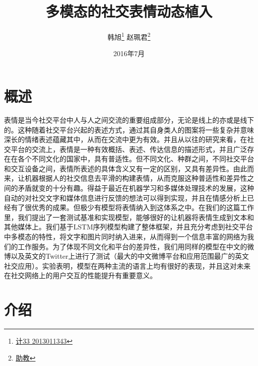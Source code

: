 \documentclass[10pt, titlepage]{article}
\begin{document}
\title{
\Huge\textbf{多模态的社交表情动态植入}
}


\author{
韩旭\thanks{\href{mailto:计33 2013011343}{计33 2013011343}}\quad
赵珮君\thanks{\href{mailto:助教}{助教}}}

\date{2016年7月}
\maketitle
\renewcommand{\contentsname}{\textbf{Contents}}
\renewcommand{\figurename}{\textbf{figure}}
\renewcommand{\tablename}{\textbf{table}}
\tableofcontents
\newpage



\section{概述}
表情是当今社交平台中人与人之间交流的重要组成部分，无论是线上的亦或是线下的。这种随着社交平台兴起的表述方式，通过其自身类人的图案将一些复杂并意味深长的情绪表述蕴藏其中，从而在交流中更为有效。并且从以往的研究来看，在社交平台的交流上，表情是一种有效概括、表述、传达信息的描述形式，并且广泛存在在各个不同文化的国家中，具有普适性。但不同文化、种群之间，不同社交平台和交互设备之间，表情所表述的具体含义又有一定的区别，又具有差异性。由此而来，让机器根据人的社交信息去平滑的构建表情，从而克服这种普适性和差异性之间的矛盾就变的十分有趣。得益于最近在机器学习和多媒体处理技术的发展，这种自动的对社交文字和媒体信息进行反馈的想法可以得到实现，并且在情感分析上已经有了很优秀的成果。但极少有模型将表情纳入到这体系之中。在我们的这篇工作里，我们提出了一套测试基准和实现模型，能够很好的让机器将表情生成到文本和其他媒体上。我们基于LSTM序列模型构建了整体框架，并且充分考虑到社交平台中多模态的特性，将文字和图片同时纳入进来，从而得到一个信息丰富的网络为我们的工作服务。为了体现不同文化和平台的差异性，我们用同样的模型在中文的微博以及英文的Twitter上进行了测试（最大的中文微博平台和应用范围最广的英文社交应用）。实验表明，模型在两种主流的语言上均有很好的表现，并且这对未来在社交网络上的用户交互的性能提升有重要意义。


\section{介绍}
\end{document}
